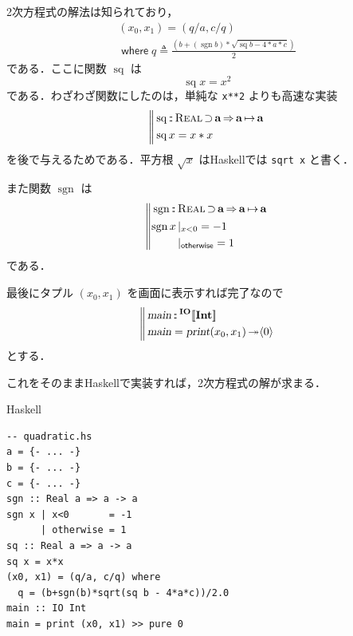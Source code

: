 \documentclass[a5paper,twoside,fleqn,draft]{jsbook}
\def\[{[\![}
\def\]{]\!]}
\DeclareMathOperator{\sgn}{sgn}
\newcommand{\programminglanguage}[1]{\textsf{#1}}
\newcommand{\haskell}{\programminglanguage{Haskell}}
\newcommand{\code}[1]{\texttt{#1}}
\newenvironment{haskellcode}{\begin{itembox}[r]{\haskell}}{\end{itembox}}
\newcommand{\mBrace}{\Vert}
\newcommand{\mKeyword}[1]{\mathsf{#1}}
\newcommand{\mOtherwiseKeyword}{\mKeyword{otherwise}}
\newcommand{\mWhereKeyword}{\mKeyword{where}}
\DeclareMathOperator{\mOtherwise}{\mOtherwiseKeyword}
\DeclareMathOperator{\mSuperClass}{\Rightarrow}
\DeclareMathOperator{\mSuperSet}{\supset}
\DeclareMathOperator{\mWhere}{\mWhereKeyword}
\newcommand{\mSpecialFunc}[1]{#1}
\DeclareMathOperator{\mSq}{\mSpecialFunc{sq}}
\newcommand{\mAction}[1]{\textsl{#1}}
\DeclareMathOperator{\mMain}{\mAction{main}}
\DeclareMathOperator{\mPrint}{\mAction{print}}
\DeclareMathOperator{\mBindRightIgnore}{\twoheadrightarrow}
\DeclareMathOperator{\mIn}{{:\!:}}
\DeclareMathOperator{\mLetEq}{\triangleq}
\DeclareMathOperator{\mMapsTo}{\mapsto}
\newcommand{\mType}[1]{\mathbf{#1}} %
\newcommand{\mA}{\mType{a}}
\newcommand{\mIntType}{\mType{Int}}
\newcommand{\mTypeAssemble}[2]{{}^{\mType{#1}}\[\mType{#2}\]}
\newcommand{\mIOType}[1]{\mTypeAssemble{IO}{#1}}
\newcommand{\mIOIntType}{\mIOType{\mIntType}}
\newcommand{\mPureWith}[1]{\langle#1\rangle}
\newcommand{\mTypeClass}[1]{\textsc{#1}} %
\newcommand{\mRealTypeClass}{\mTypeClass{Real}}
\newcommand{\mGuard}[1]{\mathop{\mid_{#1}}}
\newcommand{\mProjEXP}[2]{#1\mMapsTo#2} %
\begin{document}
2次方程式の解法は知られており，
\begin{multline}
  (x_0,x_1)=(q/a,c/q)\\
  \mWhere q\mLetEq\frac{\left(b+(\sgn b)*\sqrt{\mSq b-4*a*c}\right)}{2}
\end{multline}
である．ここに関数 $\mSq$ は
\begin{equation}
  \mSq x=x^2
\end{equation}
である．わざわざ関数にしたのは，単純な \code{x**2} よりも高速な実装
\begin{equation}
  \left\mBrace
  \begin{aligned}
    &\mSq\mIn\mRealTypeClass\mSuperSet\mA
    \mSuperClass\mProjEXP{\mA}{\mA}\\
    &\mSq x=x*x
  \end{aligned}
  \right.
\end{equation}
を後で与えるためである．平方根 $\sqrt{x}$ は\haskell では \code{sqrt
  x} と書く．

また関数 $\sgn$ は
\begin{equation}
  \left\mBrace
  \begin{aligned}
    {}&\sgn\mIn{}\mRealTypeClass\mSuperSet\mA
    \mSuperClass\mProjEXP{\mA }{\mA }\\
    {}&
    \begin{aligned}
      \sgn x&\mGuard{x<0}=-1\\
      &\mGuard{\mOtherwise}=1
    \end{aligned}
  \end{aligned}
  \right.
\end{equation}
である．

最後にタプル $(x_0,x_1)$ を画面に表示すれば完了なので
\begin{equation}
  \left\mBrace
  \begin{aligned}
    {}&\mMain\mIn\mIOIntType\\
    {}&\mMain=\mPrint(x_0,x_1)\mBindRightIgnore\mPureWith{0}
  \end{aligned}
  \right.
\end{equation}
とする．

これをそのまま\haskell で実装すれば，2次方程式の解が求まる．
\begin{haskellcode}
\begin{verbatim}
-- quadratic.hs
a = {- ... -}
b = {- ... -}
c = {- ... -}
sgn :: Real a => a -> a
sgn x | x<0       = -1
      | otherwise = 1
sq :: Real a => a -> a
sq x = x*x
(x0, x1) = (q/a, c/q) where
  q = (b+sgn(b)*sqrt(sq b - 4*a*c))/2.0
main :: IO Int
main = print (x0, x1) >> pure 0
\end{verbatim}
\end{haskellcode}
\end{document}
